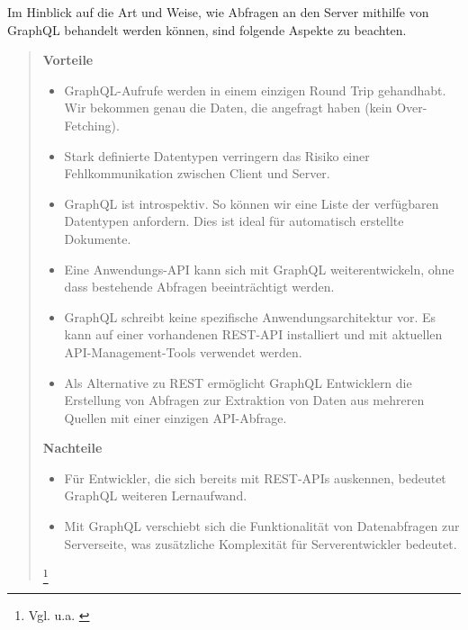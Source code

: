 Im Hinblick auf die Art und Weise, wie Abfragen an den Server mithilfe von
\\ GraphQL behandelt werden können, sind folgende Aspekte zu beachten.
\\
\begin{quote}
  \textbf{Vorteile}\\
  \begin{itemize}
    \item
          GraphQL-Aufrufe werden in einem einzigen Round Trip gehandhabt. Wir bekommen genau die Daten, die angefragt haben (kein Over-Fetching).

    \item
          Stark definierte Datentypen verringern das Risiko einer Fehlkommunikation zwischen Client und Server.

    \item
          GraphQL ist introspektiv. So können wir eine Liste der verfügbaren Datentypen anfordern. Dies ist ideal für automatisch erstellte Dokumente.

    \item
          Eine Anwendungs-API kann sich mit GraphQL weiterentwickeln, ohne dass bestehende Abfragen beeinträchtigt werden.
    \item
          GraphQL schreibt keine spezifische Anwendungsarchitektur vor. Es kann auf einer vorhandenen REST-API installiert und mit aktuellen API-Management-Tools verwendet werden.
    \item
          Als Alternative zu REST ermöglicht GraphQL Entwicklern die Erstellung von Abfragen zur Extraktion von Daten aus mehreren Quellen mit einer einzigen API-Abfrage.

  \end{itemize}

  \textbf{Nachteile}
  \begin{itemize}
    \item
          Für Entwickler, die sich bereits mit REST-APIs auskennen, bedeutet GraphQL weiteren Lernaufwand.
    \item
          Mit GraphQL verschiebt sich die Funktionalität von Datenabfragen zur Serverseite, was zusätzliche Komplexität für Serverentwickler bedeutet.

  \end{itemize}

  \footnote{Vgl. u.a. \cite{RH1}}
\end{quote}

